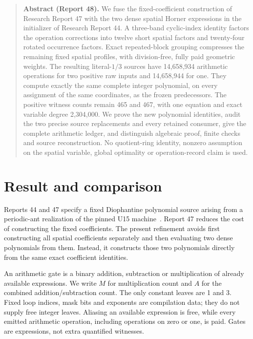 \documentclass[11pt,letterpaper]{article}
\theoremstyle{definition}\newtheorem{definition}[theorem]{Definition}
\theoremstyle{remark}\newtheorem{remark}[theorem]{Remark}
\begin{document}
\begin{quote}\small\noindent\textbf{Abstract (Report 48).} We fuse the fixed-coefficient construction of Research Report 47 with the two dense spatial Horner expressions in the initializer of Research Report 44. A three-band cyclic-index identity factors the operation corrections into twelve short spatial factors and twenty-four rotated occurrence factors. Exact repeated-block grouping compresses the remaining fixed spatial profiles, with division-free, fully paid geometric weights. The resulting literal-$1/3$ sources have 14,658,934 arithmetic operations for two positive raw inputs and 14,658,944 for one. They compute exactly the same complete integer polynomial, on every assignment of the same coordinates, as the frozen predecessors. The positive witness counts remain 465 and 467, with one equation and exact variable degree 2,304,000. We prove the new polynomial identities, audit the two precise source replacements and every retained consumer, give the complete arithmetic ledger, and distinguish algebraic proof, finite checks and source reconstruction. No quotient-ring identity, nonzero assumption on the spatial variable, global optimality or operation-record claim is used.
\end{quote}

\section{Result and comparison}\label{ptr:fu:sec:result}
Reports 44 and 47 specify a fixed Diophantine polynomial source arising from a periodic-ant realization of the pinned U15 machine~\cite{ptr:fu:r44,ptr:fu:r47}. Report 47 reduces the cost of constructing the fixed coefficients. The present refinement avoids first constructing all spatial coefficients separately and then evaluating two dense polynomials from them. Instead, it constructs those two polynomials directly from the same exact coefficient identities.

An arithmetic gate is a binary addition, subtraction or multiplication of already available expressions. We write $M$ for multiplication count and $A$ for the combined addition/subtraction count. The only constant leaves are 1 and 3. Fixed loop indices, mask bits and exponents are compilation data; they do not supply free integer leaves. Aliasing an available expression is free, while every emitted arithmetic operation, including operations on zero or one, is paid. Gates are expressions, not extra quantified witnesses.
\end{document}
